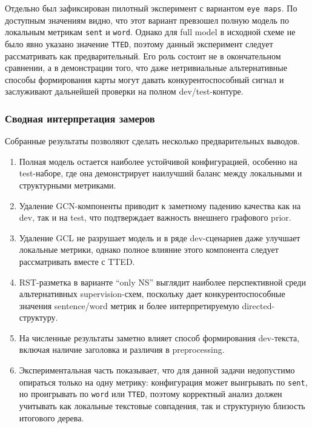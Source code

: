 \documentclass[12pt,a4paper]{article}
\begin{document}
Отдельно был зафиксирован пилотный эксперимент с вариантом \texttt{eye maps}. По
доступным значениям видно, что этот вариант превзошел полную модель по локальным
метрикам \texttt{sent} и \texttt{word}. Однако для full model в исходной схеме не
было явно указано значение \texttt{TTED}, поэтому данный эксперимент следует
рассматривать как предварительный. Его роль состоит не в окончательном сравнении,
а в демонстрации того, что даже нетривиальные альтернативные способы формирования
карты могут давать конкурентоспособный сигнал и заслуживают дальнейшей проверки на
полном dev/test-контуре.

\subsubsection{Сводная интерпретация замеров}

Собранные результаты позволяют сделать несколько предварительных выводов.

\begin{enumerate}
    \item Полная модель остается наиболее устойчивой конфигурацией, особенно на test-наборе,
    где она демонстрирует наилучший баланс между локальными и структурными метриками.
    \item Удаление GCN-компоненты приводит к заметному падению качества как на dev, так и
    на test, что подтверждает важность внешнего графового prior.
    \item Удаление GCL не разрушает модель и в ряде dev-сценариев даже улучшает локальные
    метрики, однако полное влияние этого компонента следует рассматривать вместе с TTED.
    \item RST-разметка в варианте ``only NS'' выглядит наиболее перспективной среди
    альтернативных supervision-схем, поскольку дает конкурентоспособные значения
    sentence/word метрик и более интерпретируемую directed-структуру.
    \item На численные результаты заметно влияет способ формирования dev-текста, включая
    наличие заголовка и различия в preprocessing.
    \item Экспериментальная часть показывает, что для данной задачи недопустимо
    опираться только на одну метрику: конфигурация может выигрывать по
    \texttt{sent}, но проигрывать по \texttt{word} или \texttt{TTED}, поэтому
    корректный анализ должен учитывать как локальные текстовые совпадения, так и
    структурную близость итогового дерева.
\end{enumerate}
\end{document}
